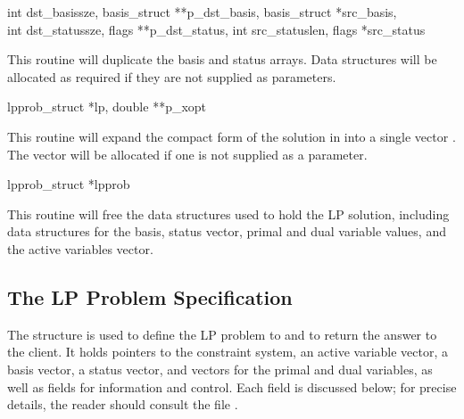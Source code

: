 \begin{subrdoc}
  \item
	  {int dst_basissze, basis_struct **p_dst_basis,
	   basis_struct *src_basis, \\ int dst_statussze,
	   flags **p_dst_status, int src_statuslen, flags *src_status}

  This routine will duplicate the basis and status arrays.
  Data structures will be allocated as required if they are not supplied as
  parameters.

  \item
	  {lpprob_struct *lp, double **p_xopt}

  This routine will expand the compact form of the solution in 
  into a single vector .
  The vector will be allocated if one is not supplied as a parameter.

  \item
	  {lpprob_struct *lpprob}

  This routine will free the data structures used to hold the LP solution,
  including data structures for the basis, status vector, primal and dual
  variable values, and the active variables vector.
\end{subrdoc}


\subsection{The LP Problem Specification}
\label{LPProbSpec}

The structure  is used to define the LP
problem to \dylp and to return the answer to the client.
It holds pointers to the constraint system, an active
variable vector, a basis vector, a status vector, and vectors
for the primal and dual variables, as well as fields for information and
control.
Each field is discussed below; for precise details, the reader should consult
the file .

